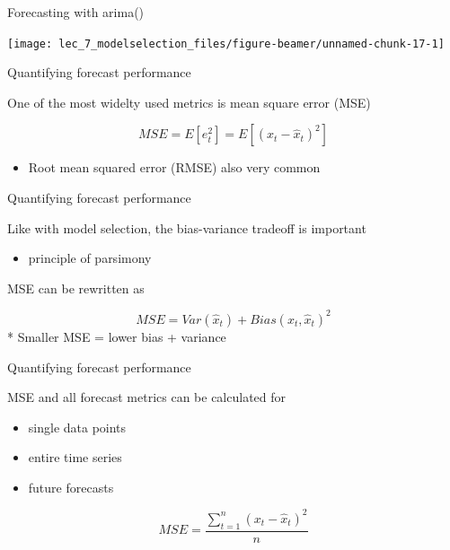 \documentclass[ignorenonframetext,]{beamer}
\providecommand{\tightlist}{%
  \setlength{\itemsep}{0pt}\setlength{\parskip}{0pt}}
\begin{document}
\begin{frame}[fragile]
\begin{block}{Forecasting with arima()}
\begin{center}\texttt{[image: lec\_7\_modelselection\_files/figure-beamer/unnamed-chunk-17-1]} \end{center}

\end{block}

\begin{block}{Quantifying forecast performance}

One of the most widelty used metrics is mean square error (MSE)

\[MSE=E\left[ { e }_{ t }^{ 2 } \right] =E\left[ { \left( { x }_{ t }-{ \hat { x }  }_{ t } \right)  }^{ 2 } \right]\]

\begin{itemize}
\tightlist
\item
  Root mean squared error (RMSE) also very common
\end{itemize}

\end{block}

\begin{block}{Quantifying forecast performance}

Like with model selection, the bias-variance tradeoff is important

\begin{itemize}
\tightlist
\item
  principle of parsimony
\end{itemize}

MSE can be rewritten as

\[MSE=Var\left( { \hat { x }  }_{ t } \right) +Bias{ \left( { x }_{ t },{ \hat { x }  }_{ t } \right)  }^{ 2 }\]
* Smaller MSE = lower bias + variance

\end{block}

\begin{block}{Quantifying forecast performance}

MSE and all forecast metrics can be calculated for

\begin{itemize}
\tightlist
\item
  single data points
\item
  entire time series
\item
  future forecasts
\end{itemize}

\[MSE={ \frac { \sum _{ t=1 }^{ n }{ { \left( { x }_{ t }-{ \hat { x }  }_{ t } \right)  }^{ 2 } }  }{ n }  }\]


\end{block}
\end{frame}
\end{document}
